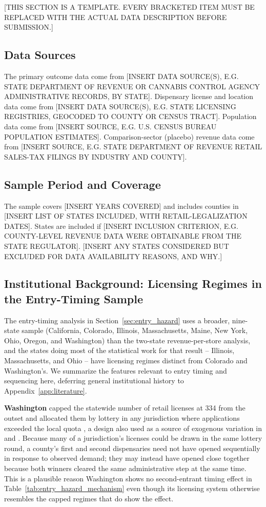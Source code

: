 \documentclass[12pt]{article}
\begin{document}
[THIS SECTION IS A TEMPLATE. EVERY BRACKETED ITEM MUST BE REPLACED WITH THE ACTUAL DATA DESCRIPTION BEFORE
SUBMISSION.]

\subsection{Data Sources}
The primary outcome data come from [INSERT DATA SOURCE(S), E.G. STATE DEPARTMENT OF REVENUE OR CANNABIS
CONTROL AGENCY ADMINISTRATIVE RECORDS, BY STATE]. Dispensary license and location data come from [INSERT
DATA SOURCE(S), E.G. STATE LICENSING REGISTRIES, GEOCODED TO COUNTY OR CENSUS TRACT]. Population data come
from [INSERT SOURCE, E.G. U.S. CENSUS BUREAU POPULATION ESTIMATES]. Comparison-sector (placebo) revenue
data come from [INSERT SOURCE, E.G. STATE DEPARTMENT OF REVENUE RETAIL SALES-TAX FILINGS BY INDUSTRY AND
COUNTY].

\subsection{Sample Period and Coverage}
The sample covers [INSERT YEARS COVERED] and includes counties in [INSERT LIST OF STATES INCLUDED, WITH
RETAIL-LEGALIZATION DATES]. States are included if [INSERT INCLUSION CRITERION, E.G. COUNTY-LEVEL REVENUE
DATA WERE OBTAINABLE FROM THE STATE REGULATOR]. [INSERT ANY STATES CONSIDERED BUT EXCLUDED FOR DATA
AVAILABILITY REASONS, AND WHY.]

\subsection{Institutional Background: Licensing Regimes in the Entry-Timing Sample}
\label{sec:institutions}

The entry-timing analysis in Section~\ref{sec:entry_hazard} uses a broader, nine-state sample (California,
Colorado, Illinois, Massachusetts, Maine, New York, Ohio, Oregon, and Washington) than the two-state
revenue-per-store analysis, and the states doing most of the statistical work for that result -- Illinois,
Massachusetts, and Ohio -- have licensing regimes distinct from Colorado and Washington's. We summarize the
features relevant to entry timing and sequencing here, deferring general institutional history to
Appendix~\ref{app:literature}.

\textbf{Washington} capped the statewide number of retail licenses at 334 from the outset and allocated them
by lottery in any jurisdiction where applications exceeded the local quota \citep{WSLCB2014LotteryPR}, a
design also used as a source of exogenous variation in \citet{DongTyndall2024} and \citet{ThomasTian2021}.
Because many of a jurisdiction's licenses could be drawn in the same lottery round, a county's first and
second dispensaries need not have opened sequentially in response to observed demand; they may instead have
opened close together because both winners cleared the same administrative step at the same time. This is a
plausible reason Washington shows no second-entrant timing effect in Table~\ref{tab:entry_hazard_mechanism}
even though its licensing system otherwise resembles the capped regimes that do show the effect.
\end{document}
